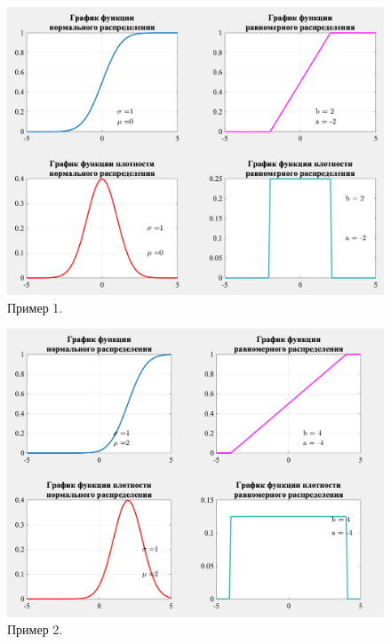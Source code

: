 \documentclass[a4paper,14pt]{extreport} %
\begin{document}
\begin{enumerate}
\begin{figure}[H]
  \centering
  \caption{Пример 1. }
  \includegraphics[scale=0.6]{2}
\end{figure}

\begin{figure}[H]
  \centering
  \caption{Пример 2. }
  \includegraphics[scale=0.6]{1}
\end{figure}


\end{enumerate}
\end{document}
